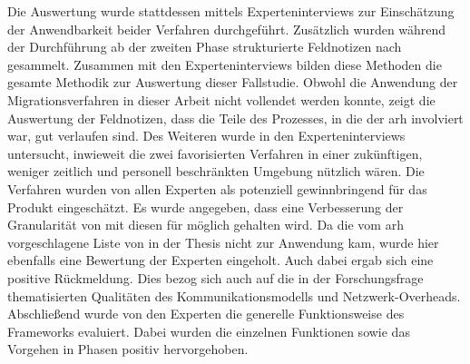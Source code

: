 Die Auswertung wurde stattdessen mittels Experteninterviews zur Einschätzung der Anwendbarkeit beider Verfahren durchgeführt.
Zusätzlich wurden während der Durchführung ab der zweiten Phase strukturierte Feldnotizen nach  gesammelt.
Zusammen mit den Experteninterviews bilden diese Methoden die gesamte Methodik zur Auswertung dieser Fallstudie.
Obwohl die Anwendung der Migrationsverfahren in dieser Arbeit nicht vollendet werden konnte, zeigt die Auswertung der Feldnotizen, dass die Teile des Prozesses, in die der \gls{arh} involviert war, gut verlaufen sind.
Des Weiteren wurde in den Experteninterviews untersucht, inwieweit die zwei favorisierten Verfahren in einer zukünftigen, weniger zeitlich und personell beschränkten Umgebung nützlich wären.
Die Verfahren wurden von allen Experten als potenziell gewinnbringend für das Produkt eingeschätzt.
Es wurde angegeben, dass eine Verbesserung der Granularität von \jf mit diesen für möglich gehalten wird.
Da die vom \gls{arh} vorgeschlagene Liste von \bpp in der Thesis nicht zur Anwendung kam, wurde hier ebenfalls eine Bewertung der Experten eingeholt.
Auch dabei ergab sich eine positive Rückmeldung.
Dies bezog sich auch auf die in der Forschungsfrage thematisierten Qualitäten des Kommunikationsmodells und Netzwerk-Overheads.
Abschließend wurde von den Experten die generelle Funktionsweise des Frameworks evaluiert.
Dabei wurden die einzelnen Funktionen sowie das Vorgehen in Phasen positiv hervorgehoben.
%

